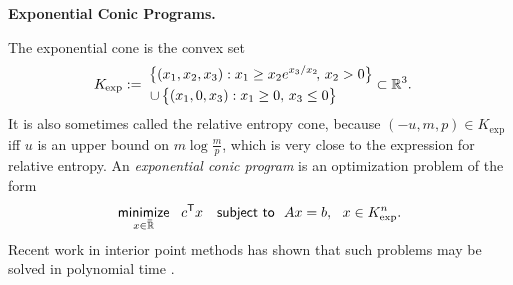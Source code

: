 \documentclass[twoside]{article}
\begin{document}
% 
\textbf{Exponential Conic Programs.}


%
%
The exponential cone is the convex set
\begin{align*}
    K_{\mskip-1mu\exp} &:=\!\!\!\!\!
        \begin{aligned}
        \big\{ (x_1, x_2, x_3) &: 
                x_1 \ge x_2 e^{x_3 / x_2}\!,\, x_2 > 0 \big\} 
            \\[-0.2ex]\quad \mathbin{\cup}\, 
        \big\{ (x_1, 0, x_3&) : x_1 \ge 0,\, x_3 \le 0 \big\} 
    \end{aligned}
    \subset \mathbb R^3.
\end{align*}
It is also sometimes called the relative entropy cone, because
$(-u, m, p) \in K_{\exp}$ iff $u$ is an upper bound on $m \log \frac m p$, 
which is very close to the expression for relative entropy.
%
An \emph{exponential conic program} is an optimization problem of the form
\[ 
    \mathop{\text{\sf minimize}}\limits_{x \in \mskip1mu\overline{\mskip-1mu\mathbb R\!}\,}~~ c^{\sf T} x
    \quad\text{\sf subject to}~~ Ax = b,~~x \in K_{\exp}^n.
\]
Recent work in interior point methods has shown that such problems may be solved in polynomial time \parencite{dahl2022primal}. 
\end{document}
